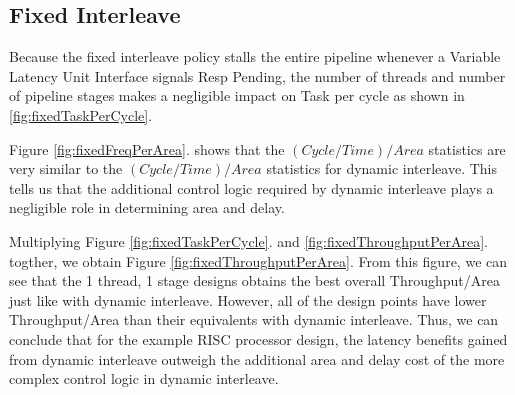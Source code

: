 \subsection{Fixed Interleave}
Because the fixed interleave policy stalls the entire pipeline whenever a Variable Latency Unit Interface signals Resp Pending, the number of threads and number of pipeline stages makes a negligible impact on Task per cycle as shown in \ref{fig:fixedTaskPerCycle}.

Figure \ref{fig:fixedFreqPerArea}. shows that the $(Cycle/Time)/Area$ statistics are very similar to the $(Cycle/Time)/Area$ statistics for dynamic interleave. This tells us that the additional control logic required by dynamic interleave plays a negligible role in determining area and delay.

Multiplying Figure \ref{fig:fixedTaskPerCycle}. and \ref{fig:fixedThroughputPerArea}. togther, we obtain Figure \ref{fig:fixedThroughputPerArea}. From this figure, we can see that the 1 thread, 1 stage designs obtains the best overall Throughput/Area just like with dynamic interleave. However, all of the design points have lower Throughput/Area than their equivalents with dynamic interleave. Thus, we can conclude that for the example RISC processor design, the latency benefits gained from dynamic interleave outweigh the additional area and delay cost of the more complex control logic in dynamic interleave.

